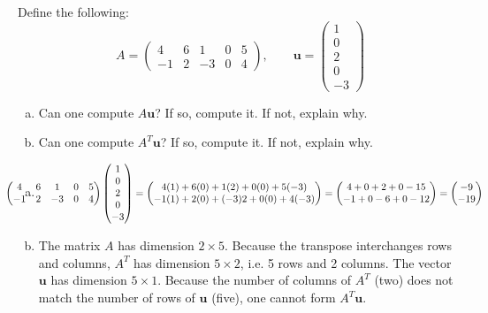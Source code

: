 \documentclass[11pt,letterpaper]{article}
\begin{document}
\newpage



 Define the following:
	\[
	A= \begin{pmatrix} 4 & 6 & 1 & 0 & 5 \\ -1 & 2 & -3 & 0 & 4 \end{pmatrix}, \qquad
	\mathbf{u}= \begin{pmatrix} 1 \\ 0 \\ 2 \\ 0 \\ -3 \end{pmatrix}
	\]

\begin{enumerate}[(a)]
\item Can one compute $A\mathbf{u}$? If so, compute it. If not, explain why. 
\item Can one compute $A^T\mathbf{u}$? If so, compute it. If not, explain why. 
\end{enumerate} \pspace

\sol 
\begin{enumerate}[(a)]
\item 
	\[
	\hspace{-1.2cm} \begin{pmatrix} 4 & 6 & 1 & 0 & 5 \\ -1 & 2 & -3 & 0 & 4 \end{pmatrix} \begin{pmatrix} 1 \\ 0 \\ 2 \\ 0 \\ -3 \end{pmatrix}= \begin{pmatrix} 4(1) + 6(0) + 1(2) + 0(0) + 5(-3) \\ -1(1) + 2(0) + (-3)2 + 0(0) + 4(-3) \end{pmatrix}= \begin{pmatrix} 4 + 0 + 2 + 0 - 15 \\ -1 + 0 - 6 + 0 - 12 \end{pmatrix}= \begin{pmatrix} -9 \\ -19 \end{pmatrix}
	\] \pspace

\item The matrix $A$ has dimension $2 \times 5$. Because the transpose interchanges rows and columns, $A^T$ has dimension $5 \times 2$, i.e. 5 rows and 2 columns. The vector $\mathbf{u}$ has dimension $5 \times 1$. Because the number of columns of $A^T$ (two) does not match the number of rows of $\mathbf{u}$ (five), one cannot form $A^T \mathbf{u}$. 
\end{enumerate}
\end{document}
